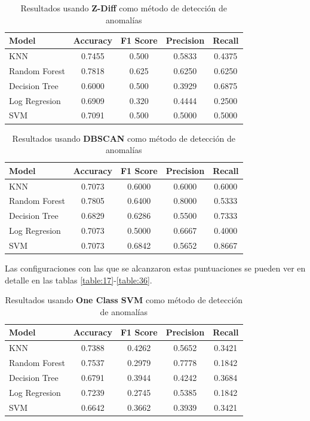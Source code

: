 	\begin{table}[htb]
		\centering
		\caption{Resultados usando \textbf{Z-Diff} como método de detección de anomalías}
		\label{table:14}
		\begin{tabular}{lcccc}
		\toprule
				Model &  Accuracy &  F1 Score &  Precision &  Recall \\
		\midrule
				  KNN &    0.7455 &     0.500 &     0.5833 &  0.4375 \\
		Random Forest &    0.7818 &     0.625 &     0.6250 &  0.6250 \\
		Decision Tree &    0.6000 &     0.500 &     0.3929 &  0.6875 \\
		Log Regresion &    0.6909 &     0.320 &     0.4444 &  0.2500 \\
				  SVM &    0.7091 &     0.500 &     0.5000 &  0.5000 \\
		\bottomrule
		\end{tabular}
	\end{table}

	\begin{table}[htb]
		\centering
		\caption{Resultados usando \textbf{DBSCAN} como método de detección de anomalías}
		\label{table:15}
		\begin{tabular}{lcccc}
		\toprule
				Model &  Accuracy &  F1 Score &  Precision &  Recall \\
		\midrule
				  KNN &    0.7073 &    0.6000 &     0.6000 &  0.6000 \\
		Random Forest &    0.7805 &    0.6400 &     0.8000 &  0.5333 \\
		Decision Tree &    0.6829 &    0.6286 &     0.5500 &  0.7333 \\
		Log Regresion &    0.7073 &    0.5000 &     0.6667 &  0.4000 \\
				  SVM &    0.7073 &    0.6842 &     0.5652 &  0.8667 \\
		\bottomrule
		\end{tabular}
	\end{table}

	Las configuraciones con las que se alcanzaron estas puntuaciones se pueden ver en detalle en las tablas \ref{table:17}-\ref{table:36}.

	\newpage
	\begin{table}[htb]
		\centering
		\caption{Resultados usando \textbf{One Class SVM} como método de detección de anomalías}
		\label{table:16}
		\begin{tabular}{lcccc}
		\toprule
				Model &  Accuracy &  F1 Score &  Precision &  Recall \\
		\midrule
				  KNN &    0.7388 &    0.4262 &     0.5652 &  0.3421 \\
		Random Forest &    0.7537 &    0.2979 &     0.7778 &  0.1842 \\
		Decision Tree &    0.6791 &    0.3944 &     0.4242 &  0.3684 \\
		Log Regresion &    0.7239 &    0.2745 &     0.5385 &  0.1842 \\
				  SVM &    0.6642 &    0.3662 &     0.3939 &  0.3421 \\
		\bottomrule
		\end{tabular}
	\end{table}

